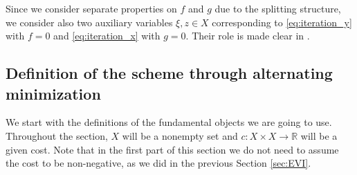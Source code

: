 \documentclass[reqno]{amsart}
\theoremstyle{plain}
\theoremstyle{remark}
\theoremstyle{plain}
\numberwithin{equation}{section}
\theoremstyle{remark}
\newcommand{\R}{\mathbb{R}}
\begin{document}
Since we consider separate properties on $f$ and $g$ due to the splitting structure, we consider also two auxiliary variables $\xi,z\in  X $ corresponding to \eqref{eq:iteration_y} with $f=0$ and \eqref{eq:iteration_x} with $g=0$. Their role is made  clear  in .


\subsection{Definition of the scheme through alternating minimization}\label{sec:scheme}

We start with the definitions of the fundamental objects we are going to use. Throughout the section, $X$ will be  a  nonempty  set  and $c:X \times  X   \to \R$ will be a given cost.  Note that in the first part of this section we do not  need to  assume the cost to be non-negative, as we did in the previous Section \ref{sec:EVI}. 
\end{document}
